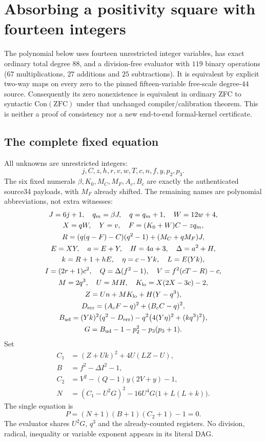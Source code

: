 \section{Absorbing a positivity square with fourteen integers}
\label{sec:positive-root14}
The polynomial below uses fourteen unrestricted integer variables, has exact
ordinary total degree $88$, and a division-free evaluator with $119$ binary
operations ($67$ multiplications, $27$ additions and $25$ subtractions).
It is equivalent by explicit two-way maps on every zero to the pinned
fifteen-variable free-scale degree-$44$ source. Consequently its zero
nonexistence is equivalent in ordinary ZFC to syntactic $\mathrm{Con}(\mathrm{ZFC})$
under that unchanged compiler/calibration theorem. This is neither a proof of
consistency nor a new end-to-end formal-kernel certificate.

\subsection{The complete fixed equation}
All unknowns are unrestricted integers:
\[
 j,C,z,h,r,v,w,T,c,n,f,y,p_2,p_3.
\]
The six fixed numerals $\beta,K_0,M_C,M_F,A_c,B_c$ are exactly the authenticated
source34 payloads, with $M_F$ already shifted. The remaining names are polynomial
abbreviations, not extra witnesses:
\begin{gather*}
 J=6j+1,\quad q_m=\beta J,\quad q=q_m+1,\quad W=12w+4,\\
 X=qW,\quad Y=v,\quad F=(K_0+W)C-zq_m,\\
 R=(q(q-F)-C)(q^2-1)+(M_C+qM_F)J,\\
 E=XY,\quad a=E+Y,\quad H=4a+3,\quad\Delta=a^2+H,\\
 k=R+1+hE,\quad \eta=c-Yk,\quad L=E(Yk),\\
 I=(2r+1)c^2,\quad Q=\Delta(f^2-1),\quad V=f^2(cT-R)-c,\\
 M=2q^3,\quad U=MH,\quad K_{\rm lo}=X(2X-3c)-2,\\
 Z=Un+MK_{\rm lo}+H(Y-q^3),\\
 D_{\rm err}=(A_cF-q)^2+(B_cC-q)^2,\\
 B_{\rm ud}=(Yk)^2(q^2-D_{\rm err})
       -q^2\bigl(4(Y\eta)^2+(kq^3)^2\bigr),\\
 G=B_{\rm ud}-1-p_2^2-p_3(p_3+1).
\end{gather*}
Set
\begin{align*}
 C_1&=(Z+Uk)^2+4U(LZ-U),\\
 B&=f^2-\Delta I^2-1,\\
 C_2&=V^2-(Q-1)y(2V+y)-1,\\
 N&=(C_1-U^2G)^2-16U^4G\bigl(1+L(L+k)\bigr).
\end{align*}
The single equation is
\[
 \boxed{P=(N+1)(B+1)(C_2+1)-1=0.}
\]
The evaluator shares $U^2G$, $q^3$ and the already-counted registers. No division,
radical, inequality or variable exponent appears in its literal DAG.

